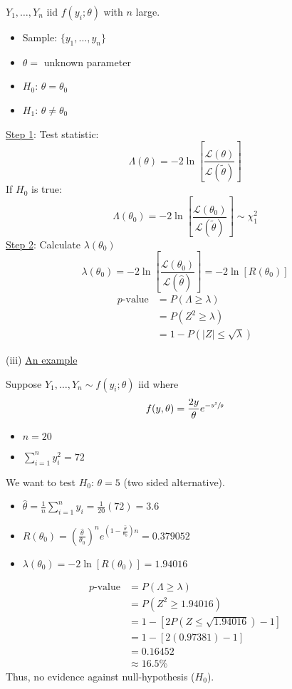 $ Y_1,\ldots ,Y_n $ iid $ f(y_i;\theta) $ with $ n $ large.
\begin{itemize}
    \item Sample: $ \{y_1,\ldots ,y_n\} $
    \item $ \theta= $ unknown parameter
    \item $ H_0 $: $ \theta=\theta_0 $
    \item $ H_1 $: $ \theta\neq\theta_0 $
\end{itemize}
\underline{Step 1}: Test statistic:
\[ \Lambda(\theta)=-2\ln\left[ \frac{\mathcal{L}(\theta)}{\mathcal{L}(\tilde{\theta})}  \right] \]
If $ H_0 $ is true:
\[ \Lambda(\theta_0)=-2\ln\left[ \frac{\mathcal{L}(\theta_0)}{\mathcal{L}(\tilde{\theta})}  \right]
    \sim \chi^2_{1} \]
\underline{Step 2}: Calculate $ \lambda(\theta_0) $
\[ \lambda(\theta_0)=-2\ln\left[ \frac{\mathcal{L}(\theta_0)}{\mathcal{L}(\hat{\theta})}  \right]=-2\ln
    \left[ R(\theta_0) \right] \]
\begin{align*}
    p\text{-value}
     & =P(\Lambda\geqslant \lambda)      \\
     & =P(Z^2\geqslant \lambda)          \\
     & =1-P(|Z|\leqslant \sqrt{\lambda})
\end{align*}

(iii) \underline{An example}

\begin{Example}{}{}
    Suppose $ Y_1,\ldots ,Y_n \sim f(y_i;\theta) $ iid where
    \[ f(y,\theta)=\frac{2y}{\theta}e^{-\sfrac{y^2}{\theta}} \]
    \begin{itemize}
        \item $ n=20 $
        \item $ \sum\limits_{i=1}^{n} y_i^2=72 $
    \end{itemize}

    We want to test $ H_0 $: $ \theta=5 $ (two sided alternative).
    \begin{itemize}
        \item $ \hat{\theta}=\frac{1}{n} \sum\limits_{i=1}^{n}y_i=\frac{1}{20}(72)=3.6 $
        \item $ R(\theta_0)=\left( \frac{\hat{\theta}}{\theta_0} \right)^n
                  e^{\left(1-\frac{\hat{\theta}}{\theta_0}\right)n} = 0.379052 $
        \item $ \lambda(\theta_0) =-2\ln \left[ R(\theta_0) \right]=1.94016 $
    \end{itemize}
    \begin{align*}
        p\text{-value}
         & =P(\Lambda\geqslant \lambda)                       \\
         & =P(Z^2\geqslant 1.94016)                           \\
         & =1-\left[ 2 P(Z\leqslant \sqrt{1.94016})-1 \right] \\
         & = 1-\left[ 2(0.97381)-1 \right]                    \\
         & = 0.16452                                          \\
         & \approx 16.5\%
    \end{align*}
    Thus, no evidence against null-hypothesis ($ H_0 $).
\end{Example}


